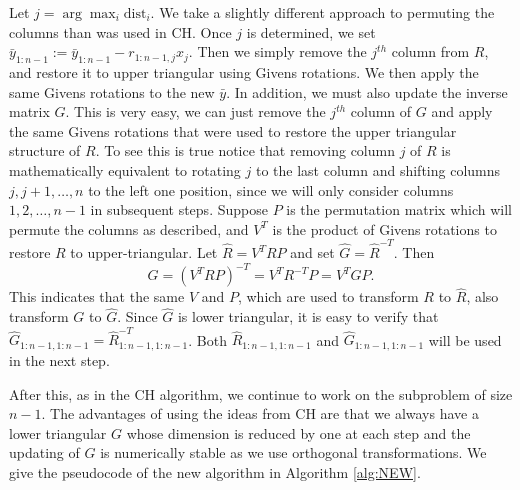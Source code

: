 \documentclass[12pt,Bold,letterpaper]{mcgilletdclass}
\newcommand{\dist}{\mathrm{dist}}
\begin{document}
Let $j=\arg\max_{i} \dist_i$. We  take a slightly different approach to
permuting the columns than was used in CH. Once $j$ is determined, we  
set $\bar{y}_{1:n-1} := \bar{y}_{1:n-1} - r_{1:n-1,j}x_j$. Then we simply remove
the $j^{th}$ column from $R$, and restore it to upper triangular using
Givens rotations. We then apply the same Givens rotations to the new
$\bar{y}$. In addition, we must also update the inverse matrix $G$. This is
very easy, we can just remove the $j^{th}$ column of $G$ and apply the same
Givens rotations that were used to restore the upper triangular structure of
$R$. To see this is true notice that removing column $j$ of $R$ is
mathematically equivalent to rotating $j$ to the last column and shifting
columns $j, j+1, \ldots, n$ to the left one position, since we will only consider columns
$1, 2, \ldots, n-1$ in subsequent steps. Suppose $P$ is the permutation matrix which
will permute the columns as described, and $V^T$ is the product of Givens
rotations to restore $R$ to upper-triangular. Let $\hat{R} = V^TRP$ and set
$\hat{G} = \hat{R}^{-T}$. Then
$$
\hat{G} = (V^TRP)^{-T} = V^TR^{-T}P = V^TGP.
$$
This indicates that  the same $V$ and $P$, which are used to transform $R$ to  $\hat{R}$, 
also transform $G$ to $\hat{G}$.
Since $\hat{G}$ is lower triangular, it is easy to verify that
$\hat{G}_{1:n-1,1:n-1} = \hat{R}^{-T}_{1:n-1,1:n-1}$.
Both $\hat{R}_{1:n-1,1:n-1}$ and $\hat{G}_{1:n-1,1:n-1}$ will be used in the next step.

After this, as in the CH algorithm, we continue to work on the subproblem of size $n-1$. 
The advantages of using the ideas from CH are that we always have a lower triangular $G$
whose dimension is reduced by one at each step
and the updating of $G$ is numerically stable as we use orthogonal transformations.
We give the pseudocode of the new algorithm in Algorithm  \ref{alg:NEW}.
\end{document}
